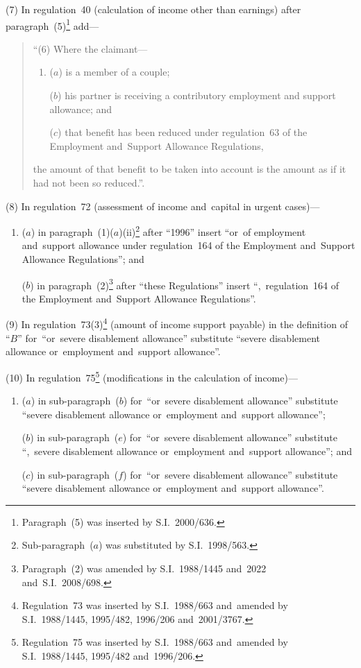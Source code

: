 \documentclass[12pt,a4paper]{article}
\begin{document}
(7) In regulation~40 (calculation of income other than earnings) after paragraph~(5)\footnote{Paragraph~(5) was inserted by S.I.~2000/636.} add—
\begin{quotation}
“(6) Where the claimant—
\begin{enumerate}\item[]
($a$) is a member of a couple;

($b$) his partner is receiving a contributory employment and support allowance; and

($c$) that benefit has been reduced under regulation~63 of the Employment and~Support Allowance Regulations,
\end{enumerate}
the amount of that benefit to be taken into account is the amount as if it had not been so reduced.”.
\end{quotation}

(8) In regulation~72 (assessment of income and~capital in urgent cases)—
\begin{enumerate}\item[]
($a$) in paragraph~(1)($a$)(ii)\footnote{Sub-paragraph~($a$) was substituted by S.I.~1998/563.} after “1996” insert “or~of employment and~support allowance under regulation~164 of the Employment and~Support Allowance Regulations”; and

($b$) in paragraph~(2)\footnote{Paragraph~(2) was amended by S.I.~1988/1445 and~2022 and~S.I.~2008/698.} after “these Regulations” insert “,~regulation~164 of the Employment and~Support Allowance Regulations”.
\end{enumerate}

(9) In regulation~73(3)\footnote{Regulation~73 was inserted by S.I.~1988/663 and~amended by S.I.~1988/1445, 1995/482, 1996/206 and~2001/3767.} (amount of income support payable) in the definition of “$B$” for~“or~severe disablement allowance” substitute “severe disablement allowance or~employment and~support allowance”.

(10) In regulation~75\footnote{Regulation~75 was inserted by S.I.~1988/663 and~amended by S.I.~1988/1445, 1995/482 and~1996/206.} (modifications in the calculation of income)—
\begin{enumerate}\item[]
($a$) in sub-paragraph~($b$)  for~“or~severe disablement allowance” substitute “severe disablement allowance or~employment and~support allowance”;

($b$) in sub-paragraph~($e$)  for~“or~severe disablement allowance” substitute “,~severe disablement allowance or~employment and~support allowance”; and

($c$) in sub-paragraph~($f$)  for~“or~severe disablement allowance” substitute “severe disablement allowance or~employment and~support allowance”.
\end{enumerate}
\end{document}
